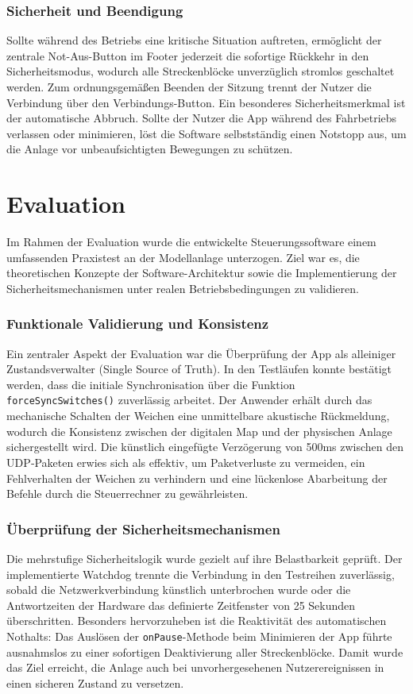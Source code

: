 \documentclass{article}
\begin{document}
\subsubsection{Sicherheit und Beendigung}
Sollte während des Betriebs eine kritische Situation auftreten, ermöglicht der zentrale Not-Aus-Button im Footer jederzeit die sofortige Rückkehr in den Sicherheitsmodus, wodurch alle Streckenblöcke unverzüglich stromlos geschaltet werden.
Zum ordnungsgemäßen Beenden der Sitzung trennt der Nutzer die Verbindung über den Verbindungs-Button.
Ein besonderes Sicherheitsmerkmal ist der automatische Abbruch.
Sollte der Nutzer die App während des Fahrbetriebs verlassen oder minimieren, löst die Software selbstständig einen Notstopp aus, um die Anlage vor unbeaufsichtigten Bewegungen zu schützen.


\section{Evaluation}
Im Rahmen der Evaluation wurde die entwickelte Steuerungssoftware einem umfassenden Praxistest an der Modellanlage unterzogen.
Ziel war es, die theoretischen Konzepte der Software-Architektur sowie die Implementierung der Sicherheitsmechanismen unter realen Betriebsbedingungen zu validieren.

\subsubsection{Funktionale Validierung und Konsistenz}
Ein zentraler Aspekt der Evaluation war die Überprüfung der App als alleiniger Zustandsverwalter (Single Source of Truth).
In den Testläufen konnte bestätigt werden, dass die initiale Synchronisation über die Funktion \texttt{forceSyncSwitches()} zuverlässig arbeitet.
Der Anwender erhält durch das mechanische Schalten der Weichen eine unmittelbare akustische Rückmeldung, wodurch die Konsistenz zwischen der digitalen Map und der physischen Anlage sichergestellt wird.
Die künstlich eingefügte Verzögerung von 500ms zwischen den UDP‑Paketen erwies sich als effektiv, um Paketverluste zu vermeiden, ein Fehlverhalten der Weichen zu verhindern und eine lückenlose Abarbeitung der Befehle durch die Steuerrechner zu gewährleisten.

\subsubsection{Überprüfung der Sicherheitsmechanismen}
Die mehrstufige Sicherheitslogik wurde gezielt auf ihre Belastbarkeit geprüft.
Der implementierte Watchdog trennte die Verbindung in den Testreihen zuverlässig, sobald die Netzwerkverbindung künstlich unterbrochen wurde oder die Antwortzeiten der Hardware das definierte Zeitfenster von 25 Sekunden überschritten.
Besonders hervorzuheben ist die Reaktivität des automatischen Nothalts:
Das Auslösen der \texttt{onPause}-Methode beim Minimieren der App führte ausnahmslos zu einer sofortigen Deaktivierung aller Streckenblöcke.
Damit wurde das Ziel erreicht, die Anlage auch bei unvorhergesehenen Nutzerereignissen in einen sicheren Zustand zu versetzen.
\end{document}
